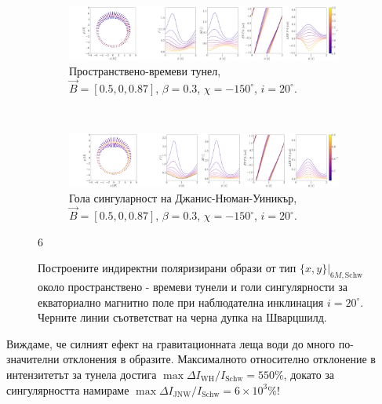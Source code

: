 \documentclass[12pt]{article}
\numberwithin{equation}{section}
\numberwithin{figure}{section}
\begin{document}
	\begin{figure}[!htb]
		\begin{subfigure}{16cm}
			\hspace{-1.0em}
			\includegraphics[scale = 0.15]{Section_7_Polarized_Emission/WH_delta_fig_B_0.5_0.87_0_20_deg_r6_n1.png}
			\caption{Пространствено-времеви тунел,\\ $\vec{B} = [0.5, 0, 0.87]$, $\beta = 0.3$, $\chi = -150^\circ$, $i = 20^\circ$.} 
		\end{subfigure}\\
		\begin{subfigure}{17cm}
			\hspace{-1.0em}
			\includegraphics[scale = 0.15]{Section_7_Polarized_Emission/JNW_delta_fig_B_0.5_0.87_0_20_deg_r6_n1.png}
			\caption{Гола сингуларност на Джанис-Нюман-Уиникър,\\  $\vec{B} = [0.5, 0, 0.87]$, $\beta = 0.3$, $\chi = -150^\circ$, $i = 20^\circ$.}
		\end{subfigure}
		\caption[Поляризирани индиректни образи около пространствено - времеви тунели и голи сингулярности за екваториално магнитно поле при $i = 20^\circ$.]{\small Построените индиректни поляризирани образи от тип $\{x,y\}\vert_{6M, \text{Schw}}$ около пространствено - времеви тунели  и голи сингулярности за екваториално магнитно поле при наблюдателна инклинация $i = 20^\circ$. Черните линии съответстват на черна дупка на Шварцшилд.} 6
		\label{Inirect_image_deltas_20}
	\end{figure}
	
	Виждаме, че силният ефект на гравитационната леща води до много по-значителни отклонения в образите. Максималното относително отклонение в интензитетът за тунела достига $\max \Delta I_\text{WH} / I_{\text{Schw}} = 550\%$, докато за сингулярността намираме $\max \Delta I_\text{JNW} / I_{\text{Schw}} = 6\times10^3\%$!\\
	
\end{document}
